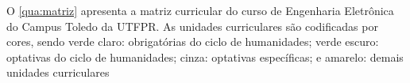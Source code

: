 



O \autoref{qua:matriz} apresenta a matriz curricular do curso de Engenharia Eletrônica do Campus Toledo da UTFPR. As unidades curriculares são codificadas por cores, sendo verde claro: obrigatórias do ciclo de humanidades; verde escuro: optativas do ciclo de humanidades; cinza: optativas específicas; e amarelo: demais unidades curriculares %


